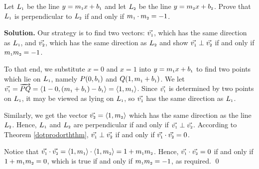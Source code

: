 \documentclass{ximera}
\begin{document}
\begin{ex}\label{perpendicularlines2} Let $L_{\mbox{\tiny$1$}}$ be the line $y = m_{\mbox{\tiny$1$}}x + b_{\mbox{\tiny$1$}}$ and let $L_{\mbox{\tiny$2$}}$ be the line $y = m_{\mbox{\tiny$2$}}x + b_{\mbox{\tiny$2$}}$.  Prove that $L_{\mbox{\tiny$1$}}$ is perpendicular to $L_{\mbox{\tiny$2$}}$ if and only if $m_{\mbox{\tiny$1$}} \cdot m_{\mbox{\tiny$2$}} = -1$.

\smallskip

{\bf Solution.}  Our strategy is to find two vectors: $\vec{v_{\mbox{\tiny$1$}}}$, which has the same direction as $L_{\mbox{\tiny$1$}}$,  and $\vec{v_{\mbox{\tiny$2$}}}$, which has the same direction as $L_{\mbox{\tiny$2$}}$ and show $\vec{v_{\mbox{\tiny$1$}}} \perp \vec{v_{\mbox{\tiny$2$}}}$ if and only if $ m_{\mbox{\tiny$1$}}  m_{\mbox{\tiny$2$}} = -1$. 

\smallskip

 To that end, we substitute $x=0$ and $x=1$ into $y = m_{\mbox{\tiny$1$}}x + b_{\mbox{\tiny$1$}}$  to find two points which lie on $L_{\mbox{\tiny$1$}}$, namely $P(0,  b_{\mbox{\tiny$1$}})$ and $Q(1, m_{\mbox{\tiny$1$}} + b_{\mbox{\tiny$1$}})$.  
 We let $\vec{v_{\mbox{\tiny$1$}}} = \overrightarrow{PQ} = \left<1-0,(m_{\mbox{\tiny$1$}}+b_{\mbox{\tiny$1$}}) - b_{\mbox{\tiny$1$}}\right>=\left<1,m_{\mbox{\tiny$1$}}\right>$.  Since  $\vec{v_{\mbox{\tiny$1$}}}$ is determined by two points on $L_{\mbox{\tiny$1$}}$, it may be viewed as lying on $L_{\mbox{\tiny$1$}}$, so $\vec{v_{\mbox{\tiny$1$}}}$  has the same direction as $L_{\mbox{\tiny$1$}}$. 
 
 \smallskip
 
 Similarly, we get the vector  $\vec{v_{\mbox{\tiny$2$}}} = \left<1,m_{\mbox{\tiny$2$}}\right>$ which has the same direction as the line 
$L_{\mbox{\tiny$2$}}$.  Hence, $L_{\mbox{\tiny$1$}}$ and $L_{\mbox{\tiny$2$}}$ are perpendicular if and only if $\vec{v_{\mbox{\tiny$1$}}} \perp \vec{v_{\mbox{\tiny$2$}}}$. According to Theorem \ref{dotprodorththm}, $\vec{v_{\mbox{\tiny$1$}}} \perp \vec{v_{\mbox{\tiny$2$}}}$ if and only if $\vec{v_{\mbox{\tiny$1$}}} \cdot \vec{v_{\mbox{\tiny$2$}}} = 0$.  

\smallskip

Notice that $\vec{v_{\mbox{\tiny$1$}}} \cdot \vec{v_{\mbox{\tiny$2$}}} = \left<1,m_{\mbox{\tiny$1$}}\right> \cdot \left<1,m_{\mbox{\tiny$2$}}\right> = 1 + m_{\mbox{\tiny$1$}}m_{\mbox{\tiny$2$}}$.  Hence,  $\vec{v_{\mbox{\tiny$1$}}} \cdot \vec{v_{\mbox{\tiny$2$}}} = 0$ if and only if $1 + m_{\mbox{\tiny$1$}}m_{\mbox{\tiny$2$}}  =0$, which is true if and only if $ m_{\mbox{\tiny$1$}}  m_{\mbox{\tiny$2$}} = -1$, as required. \qed

\end{ex}
\end{document}

